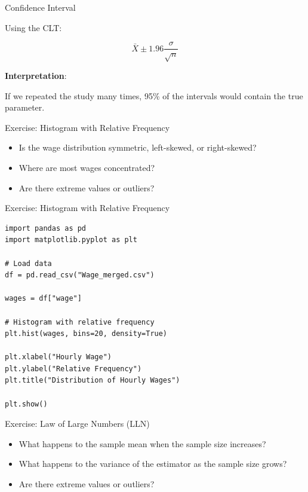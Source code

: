 \documentclass{beamer}
\begin{document}
\begin{frame}{Confidence Interval}

Using the CLT:

\[
\bar{X} \pm 1.96 \frac{\sigma}{\sqrt{n}}
\]

\vspace{0.25cm}

\textbf{Interpretation}:

If we repeated the study many times,
95\% of the intervals would contain the true parameter.

\end{frame}


\begin{frame}[fragile]{Exercise: Histogram with Relative Frequency}

\begin{itemize}
    \item Is the wage distribution symmetric, left-skewed, or right-skewed?
    \item Where are most wages concentrated?
    \item Are there extreme values or outliers?
\end{itemize}
    
\end{frame}

\begin{frame}[fragile]{Exercise: Histogram with Relative Frequency}

\begin{verbatim}
import pandas as pd
import matplotlib.pyplot as plt

# Load data
df = pd.read_csv("Wage_merged.csv")

wages = df["wage"]

# Histogram with relative frequency
plt.hist(wages, bins=20, density=True)

plt.xlabel("Hourly Wage")
plt.ylabel("Relative Frequency")
plt.title("Distribution of Hourly Wages")

plt.show()
\end{verbatim}
    
\end{frame}

\begin{frame}[fragile]{Exercise: Law of Large Numbers (LLN)}

\begin{itemize}
    \item What happens to the sample mean when the sample size increases?
    \item What happens to the variance of the estimator as the sample size grows?
    \item Are there extreme values or outliers?
\end{itemize}
    
\end{frame}
\end{document}

